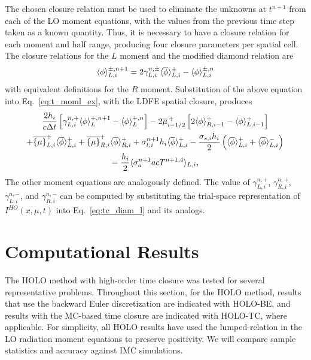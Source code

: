 The chosen closure relation must be used to eliminate the unknowns at $t^{n+1}$ from each
of the LO moment equations, with the values from the previous time step taken as a known quantity.  Thus, it is necessary to have a closure relation for each moment and half
range, producing four closure parameters per spatial cell.  The closure relations for the
$L$ moment and the modified diamond relation are
\begin{equation}\label{eq:tc_diam_l}
    \langle \phi \rangle_{L,i}^{\pm,n+1} = 2 \gamma_{L,i}^{n,\pm}\langle \overline\phi \rangle_{L,i}^{\pm} -
    \langle \phi \rangle_{L,i}^{\pm,n}
\end{equation}
with equivalent definitions for the $R$ moment.  Substitution of the above equation into
Eq.~\eqref{eq:t_moml_ex}, with the LDFE spatial closure, produces
\begin{multline}
    \frac{2h_i}{c\Delta t}\left[ \gamma_{L,i}^{n,+} \langle \phi \rangle_L^{+,n+1} - \langle \phi \rangle_L^{+,n} \right]
    -2\overline {\mu}_{i-1/2}^{\,+}\left[ 2\langle \phi \rangle_{R,i-1}^+ -
    \langle \phi \rangle_{L,i-1}^+\right] \\ + \overline{\left\{ \mu \right\}}_{L,i}^{+}
  \langle \overline{\phi} \rangle_{L,i}^{+}
  +  \overline{\left\{ \mu \right\}}_{R,i}^{+}
  \langle \overline{\phi} \rangle_{R,i}^{+} +  \sigma_{t,i}^{n+1} h_i 
  \langle \overline\phi \rangle_{L,i}^{+} -  \frac{\sigma_{s,i} h_i}{2} \left( \langle \overline{\phi} \rangle_{L,i}^{+} +
  \langle \overline{\phi} \rangle_{L,i}^{-}\right) 
  \\= \frac{h_i}{2} \langle \sigma_a^{n+1} a c T^{n+1,4} \rangle_{L,i},
\end{multline}
The other moment equations are analogously defined.  
The value of $\gamma_{L,i}^{n,+}$, $\gamma_{R,i}^{n,+}$, $\gamma_{L,i}^{n,-}$, and
    $\gamma_{R,i}^{n,-}$
can be computed by substituting the trial-space representation of $I^{HO}(x,\mu,t)$ into
Eq.~\eqref{eq:tc_diam_l} and its analogs.

\section{Computational Results}

The HOLO method with high-order time closure was tested for several
representative problems. Throughout this section, for the HOLO method, results that use the
backward Euler discretization are indicated with HOLO-BE, and results with the MC-based time
closure are indicated with HOLO-TC, where applicable.  For simplicity, all HOLO
results have used the lumped-relation in the LO radiation moment equations to
preserve positivity. We will compare sample statistics and accuracy against IMC
simulations.  

